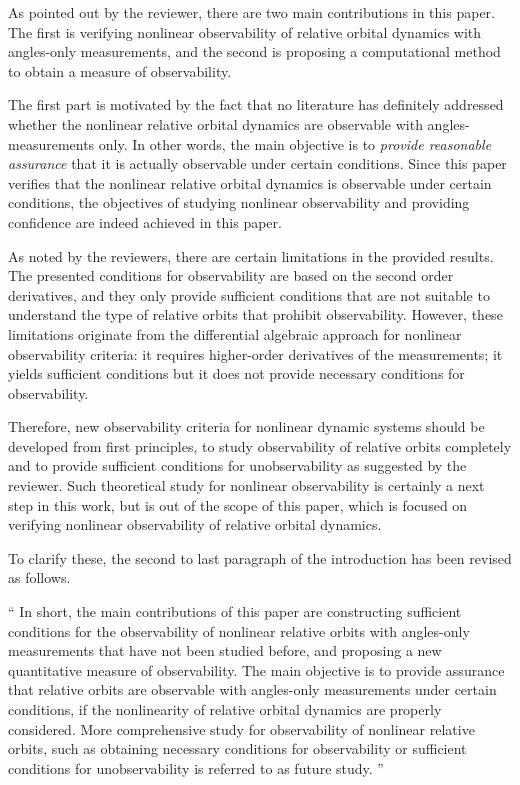\documentclass[11pt]{article}
\newenvironment{correction}{\begin{list}{}{\setlength{\leftmargin}{1cm}\setlength{\rightmargin}{1cm}}\vspace{\parsep}\item[]``}{''\end{list}}
\begin{document}
\begin{itemize}
As pointed out by the reviewer, there are two main contributions in this paper. The first is verifying nonlinear observability of relative orbital dynamics with angles-only measurements, and the second is proposing a computational method to obtain a measure of observability. 

The first part is motivated by the fact that no literature has definitely addressed whether the nonlinear relative orbital dynamics are observable with angles-measurements only. In other words, the main objective is to \textit{provide reasonable assurance} that it is actually observable under certain conditions. Since this paper verifies that the nonlinear relative orbital dynamics is observable under certain conditions, the objectives of studying nonlinear observability and providing confidence are indeed achieved in this paper. 

As noted by the reviewers, there are certain limitations in the provided results. The presented conditions for observability are based on the second order derivatives, and they only provide sufficient conditions that are not suitable to understand the type of relative orbits that prohibit observability. However, these limitations originate from the differential algebraic approach for nonlinear observability criteria: it requires higher-order derivatives of the measurements; it yields sufficient conditions but it does not provide necessary conditions for observability. 

Therefore, new observability criteria for nonlinear dynamic systems should be developed from first principles, to study observability of relative orbits completely and to provide sufficient conditions for unobservability as suggested by the reviewer. Such theoretical study for nonlinear observability is certainly a next step in this work, but is out of the scope of this paper, which is focused on verifying nonlinear observability of relative orbital dynamics. 

To clarify these, the second to last paragraph of the introduction has been revised as follows.

\begin{correction}
In short, the main contributions of this paper are constructing sufficient conditions for the observability of nonlinear relative orbits with angles-only measurements that have not been studied before, and proposing a new quantitative measure of observability. The main objective is to provide assurance that relative orbits are observable with angles-only measurements under certain conditions, if the nonlinearity of relative orbital dynamics are properly considered. More comprehensive study for observability of nonlinear relative orbits, such as obtaining necessary conditions for observability or sufficient conditions for unobservability is referred to as future study. 
\end{correction}


\end{itemize}
\end{document}
